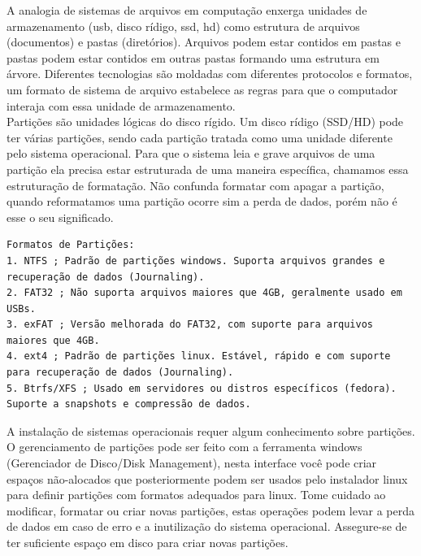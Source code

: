 \documentclass[12pt,a4paper]{article}
\begin{document}
\vspace{\baselineskip}

A analogia de sistemas de arquivos em computação enxerga unidades de armazenamento (usb, disco rídigo, ssd, hd) como estrutura de arquivos (documentos) e pastas (diretórios). Arquivos podem estar contidos em pastas e pastas podem estar contidos em outras pastas formando uma estrutura em árvore. Diferentes tecnologias são moldadas com diferentes protocolos e formatos, um formato de sistema de arquivo estabelece as regras para que o computador interaja com essa unidade de armazenamento. \\

Partições são unidades lógicas do disco rígido. Um disco rídigo (SSD/HD) pode ter várias partições, sendo cada partição tratada como uma unidade diferente pelo sistema operacional. Para que o sistema leia e grave arquivos de uma partição ela precisa estar estruturada de uma maneira específica, chamamos essa estruturação de formatação. Não confunda formatar com apagar a partição, quando reformatamos uma partição ocorre sim a perda de dados, porém não é esse o seu significado. \\

\begin{lstlisting}
Formatos de Partições:
1. NTFS ; Padrão de partições windows. Suporta arquivos grandes e recuperação de dados (Journaling).
2. FAT32 ; Não suporta arquivos maiores que 4GB, geralmente usado em USBs.
3. exFAT ; Versão melhorada do FAT32, com suporte para arquivos maiores que 4GB.
4. ext4 ; Padrão de partições linux. Estável, rápido e com suporte para recuperação de dados (Journaling).
5. Btrfs/XFS ; Usado em servidores ou distros específicos (fedora). Suporte a snapshots e compressão de dados.
\end{lstlisting}

\vspace{\baselineskip}

A instalação de sistemas operacionais requer algum conhecimento sobre partições. O gerenciamento de partições pode ser feito com a ferramenta windows (Gerenciador de Disco/Disk Management), nesta interface você pode criar espaços não-alocados que posteriormente podem ser usados pelo instalador linux para definir partições com formatos adequados para linux. Tome cuidado ao modificar, formatar ou criar novas partições, estas operações podem levar a perda de dados em caso de erro e a inutilização do sistema operacional. Assegure-se de ter suficiente espaço em disco para criar novas partições.\\
\end{document}
